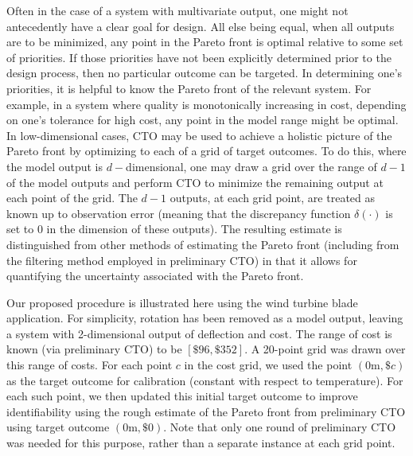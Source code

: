 \documentclass[12pt]{article}
\begin{document}
Often in the case of a system with multivariate output, one might not antecedently have a clear goal for design.
%
All else being equal, when all outputs are to be minimized, any point in the Pareto front is optimal relative to some set of priorities.
%
If those priorities have not been explicitly determined prior to the design process, then no particular outcome can be targeted.
%
In determining one's priorities, it is helpful to know the Pareto front of the relevant system.
%
For example, in a system where quality is monotonically increasing in cost, depending on one's tolerance for high cost, any point in the model range might be optimal.
%
%
In low-dimensional cases, CTO may be used to achieve a holistic picture of the Pareto front by optimizing to each of a grid of target outcomes.
%
To do this, where the model output is $d-$dimensional, one may draw a grid over the range of $d-1$ of the model outputs and perform CTO to minimize the remaining output at each point of the grid.
%
The $d-1$ outputs, at each grid point, are treated as known up to observation error (meaning that the discrepancy function $\delta(\cdot)$ is set to 0 in the dimension of these outputs).
%
The resulting estimate is distinguished from other methods of estimating the Pareto front (including from the filtering method employed in preliminary CTO) in that it allows for quantifying the uncertainty associated with the Pareto front.
%

Our proposed procedure is illustrated here using the wind turbine blade application.
%
For simplicity, rotation has been removed as a model output, leaving a system with 2-dimensional output of deflection and cost. 
%
The range of cost is known (via preliminary CTO) to be $[\$96,\$352]$.
%
A 20-point grid was drawn over this range of costs. 
%
%
For each point $c$ in the cost grid, we used the point $(0\mathrm m,\$c)$ as the target outcome for calibration (constant with respect to temperature).
%
For each such point, we then updated this initial target outcome to improve identifiability using the rough estimate of the Pareto front from preliminary CTO using target outcome $(0\mathrm m,\$0)$.
%
Note that only one round of preliminary CTO was needed for this purpose, rather than a separate instance at each grid point.
%
\end{document}
